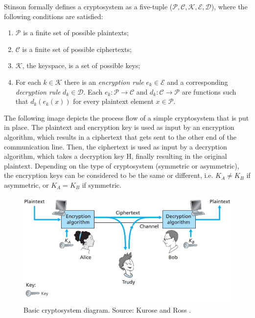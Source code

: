 Stinson \cite{stinson2005cryptography} formally defines a cryptosystem as a five-tuple ($\mathcal{P}, \mathcal{C}, \mathcal{K}, \mathcal{E}, \mathcal{D}$), where the following conditions are satisfied:
\begin{enumerate}
\item $\mathcal{P}$ is a finite set of possible plaintexts;
\item $\mathcal{C}$ is a finite set of possible ciphertexts;
\item $\mathcal{K}$, the keyspace, is a set of possible keys;
\item For each $k \in \mathcal{K}$ there is an \textit{encryption rule} $ e_{k} \in \mathcal{E}$  and a corresponding \textit{decryption rule} $ d_{k} \in \mathcal{D}$. Each $e_{k}: \mathcal{P} \rightarrow \mathcal{C}$ and $d_{k}: \mathcal{C} \rightarrow \mathcal{P}$ are functions such that $d_{k}(e_{k}(x))$ for every plaintext element $x \in \mathcal{P}$.
\end{enumerate}

The following image depicts the process flow of a simple cryptosystem that is put in place. The plaintext and encryption key is used as input by an encryption algorithm, which results in a ciphertext that gets sent to the other end of the communication line. Then, the ciphertext is used as input by a decryption algorithm, which takes a decryption key H, finally resulting in the original plaintext. Depending on the type of cryptosystem (symmetric or asymmetric), the encryption keys can be considered to be the same or different, i.e. $K_{A}\ne K_{B}$ if asymmetric, or $K_{A} = K_{B}$ if symmetric.

\begin{figure}[H]
  \centerline{\includegraphics[width=14cm]{img/basic_crypto}}
  \caption[Basic cryptosystem diagram]{Basic cryptosystem diagram. Source: Kurose and Ross \cite{kurose2010computer}.}
\end{figure}


